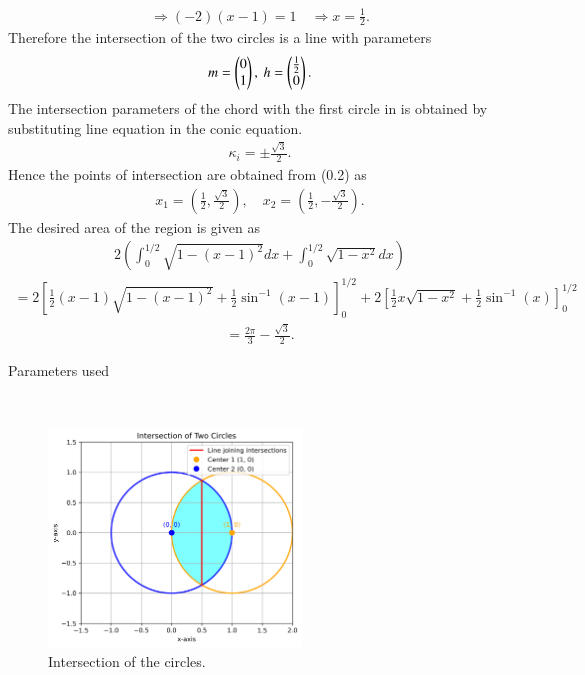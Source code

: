 \documentclass[journal]{IEEEtran}
\begin{document}
 \begin{align}
\Rightarrow (-2)(x-1) = 1 \quad \Rightarrow x = \frac{1}{2}. 
 \end{align}
Therefore the intersection of the two circles is a line with parameters
 \begin{align}
m = \begin{pmatrix}0 \\ 1\end{pmatrix}, \ h = \begin{pmatrix}\frac{1}{2} \\ 0\end{pmatrix}. 
 \end{align}
The intersection parameters of the chord with the first circle in is obtained by substituting line equation in the conic equation.
 \begin{align}
\kappa_i = \pm \frac{\sqrt{3}}{2}. 
 \end{align}
Hence the points of intersection are obtained from (0.2) as
 \begin{align}
x_1 = \left( \frac{1}{2}, \frac{\sqrt{3}}{2} \right), \quad x_2 = \left( \frac{1}{2}, -\frac{\sqrt{3}}{2} \right). 
 \end{align}
The desired area of the region is given as
 \begin{align}
2 \left( \int_0^{1/2} \sqrt{1 - (x - 1)^2} dx + \int_0^{1/2} \sqrt{1 - x^2} dx \right)
 \end{align}
 \begin{align}
= 2 \left[ \frac{1}{2} \left( x - 1 \right) \sqrt{1 - (x - 1)^2} + \frac{1}{2} \sin^{-1}(x - 1) \right]_0^{1/2} + 2 \left[ \frac{1}{2} x \sqrt{1 - x^2} + \frac{1}{2} \sin^{-1}(x) \right]_0^{1/2}
 \end{align}
 \begin{align}
= \frac{2\pi}{3} - \frac{\sqrt{3}}{2}. 
 \end{align} 
\begin{table}[h!]
    \centering
    
    \caption{Parameters used}
    \label{tab:9.5-5}
\end{table}
\\
\begin{figure}[h]
    \centering
    \includegraphics[width=0.6\textwidth]{fig.png}
    \caption{Intersection of the circles.}
\end{figure}
\end{document}
